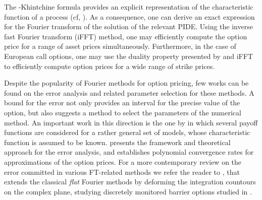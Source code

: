 \documentclass[11pt]{amsart}
\begin{document}
The \levy-Khintchine formula provides an explicit 
representation of the characteristic function of a 
\levy process (cf, \cite{tankov2004financial}).
As a consequence, one can derive an exact expression for the 
Fourier transform of the solution of the relevant PIDE.
Using the inverse fast Fourier transform (iFFT) method, one
may efficiently compute the option price for a range of asset prices
simultaneously.
Furthermore, in the case of European call options, one may
use the duality property presented by \cite{dupire1997pricing}
and iFFT to efficiently compute option prices for a wide range of strike prices.

Despite the popularity of Fourier methods for option pricing, few works
can be found on the error analysis and related parameter selection for these methods. 
A bound for the error not only provides an interval for the precise
value of the option, but also suggests a method to select the parameters of the numerical method.
An important
work in this direction is the one by \cite{lee2004option} in which several
payoff functions are considered for a rather general set of models, whose
characteristic function is assumed to be known.
\cite{fenglinetsky} presents the framework and theoretical approach
for the error analysis, and establishes polynomial convergence rates
for approximations of the option prices.
For a more
contemporary review on the error committed in various
FT-related methods we refer the reader to \cite{boyarchenko2011new},
that extends the classical \emph{flat} Fourier methods by deforming the integration countours
on the complex plane, studying discretely monitored barrier options
studied in \cite{de2014pricing}.
\end{document}
